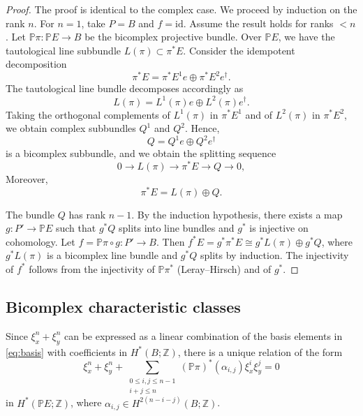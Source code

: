 \documentclass[11pt]{amsart}
\newcommand{\Z}{\mathbb{Z}}
\renewcommand{\P}{\mathbb{P}}
\theoremstyle{definition}
\begin{document}
\begin{proof}
    The proof is identical to the complex case. We proceed by induction on the rank $n$. For $n=1$, take $P=B$ and $f=\mathrm{id}$. Assume the result holds for ranks $< n$. Let $\P\pi: \P E \to B$ be the bicomplex projective bundle. Over $\P E$, we have the tautological line subbundle $L(\pi) \subset \pi^*E$. Consider the idempotent decomposition
\begin{equation*}
\pi^*E=\pi^*E^1e\oplus\pi^*E^2e^\dagger.
\end{equation*}
The tautological line bundle decomposes accordingly as
\begin{equation*}
L(\pi)=L^1(\pi)e\oplus L^2(\pi)e^\dagger.
\end{equation*}
Taking the orthogonal complements of $L^1(\pi)$ in $\pi^*E^1$ and of $L^2(\pi)$ in $\pi^*E^2$, we obtain complex subbundles $Q^1$ and $Q^2$. Hence,
\begin{equation*}
Q=Q^1e\oplus Q^2e^\dagger
\end{equation*}
is a bicomplex subbundle, and we obtain the splitting sequence
\begin{equation*}
0\longrightarrow L(\pi)\longrightarrow \pi^*E\longrightarrow Q\longrightarrow 0,
\end{equation*}
Moreover,
\begin{equation*}
\pi^*E=L(\pi)\oplus Q.
\end{equation*}

The bundle $Q$ has rank $n-1$. By the induction hypothesis, there exists a map $g: P' \to \P E$ such that $g^*Q$ splits into line bundles and $g^*$ is injective on cohomology. Let $f = \P\pi \circ g: P' \to B$. Then $f^*E = g^*\pi^*E \cong g^*L(\pi) \oplus g^*Q$, where $g^*L(\pi)$ is a bicomplex line bundle and $g^*Q$ splits by induction. The injectivity of $f^*$ follows from the injectivity of $\P\pi^*$ (Leray--Hirsch) and of $g^*$.
\end{proof}

\subsection{Bicomplex characteristic classes}

Since $\xi_x^n + \xi_y^n$ can be expressed as a linear combination of the basis elements in \eqref{eq:basis} with coefficients in $H^*(B;\Z)$, there is a unique relation of the form
\begin{equation}\label{eq:linear-relation}
    \xi_x^n + \xi_y^n + \sum\limits_{\substack{0\leq i,j\leq n-1\\ i+j\leq n}} (\mathbb{P}\pi)^*(\alpha_{i,j})\xi_x^{i}\xi_y^{j} = 0
\end{equation}
in $H^*(\P E;\Z)$, where $\alpha_{i,j} \in H^{2(n-i-j)}(B;\Z)$.
\end{document}
